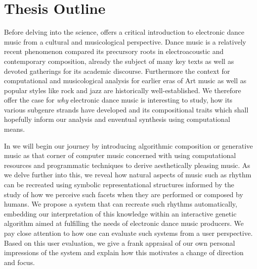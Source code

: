 \section{Thesis Outline}


Before delving into the science,  offers a critical introduction to electronic dance music from a cultural and musicological perspective. Dance music is a relatively recent phenomenon compared its precursory roots in electroacoustic and contemporary composition, already the subject of many key texts as well as devoted gatherings for its academic discourse. Furthermore the context for computational and musicological analysis for earlier eras of Art music as well as popular styles like rock and jazz are historically well-established. We therefore offer the case for \textit{why} electronic dance music is interesting to study, how its various subgenre strands have developed and its compositional traits which shall hopefully inform our analysis and enventual synthesis using computational means. 

In  we will begin our journey by introducing algorithmic composition or generative music as that corner of computer music concerned with using computational resources and programmatic techniques to derive aesthetically pleasing music. As we delve further into this, we reveal how natural aspects of music such as rhythm can be recreated using symbolic representational structures informed by the study of how we perceive such facets when they are performed or composed by humans. We propose a system that can recreate such rhythms automatically, embedding our interpretation of this knowledge within an interactive genetic algorithm aimed at fulfilling the needs of electronic dance music producers. We pay close attention to how one can evaluate such systems from a user perspective. Based on this user evaluation, we give a frank appraisal of our own personal impressions of the system and explain how this motivates a change of direction and focus.

